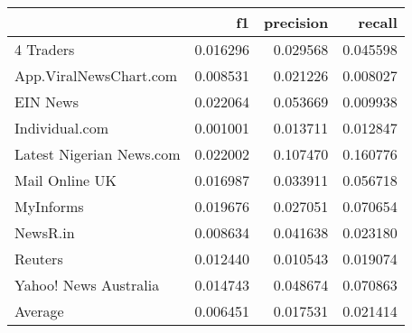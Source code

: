 \begin{tabular}{lrrr}
\toprule
{} &        f1 &  precision &    recall \\
\midrule
4 Traders                &  0.016296 &   0.029568 &  0.045598 \\
App.ViralNewsChart.com   &  0.008531 &   0.021226 &  0.008027 \\
EIN News                 &  0.022064 &   0.053669 &  0.009938 \\
Individual.com           &  0.001001 &   0.013711 &  0.012847 \\
Latest Nigerian News.com &  0.022002 &   0.107470 &  0.160776 \\
Mail Online UK           &  0.016987 &   0.033911 &  0.056718 \\
MyInforms                &  0.019676 &   0.027051 &  0.070654 \\
NewsR.in                 &  0.008634 &   0.041638 &  0.023180 \\
Reuters                  &  0.012440 &   0.010543 &  0.019074 \\
Yahoo! News Australia    &  0.014743 &   0.048674 &  0.070863 \\
Average                  &  0.006451 &   0.017531 &  0.021414 \\
\bottomrule
\end{tabular}
